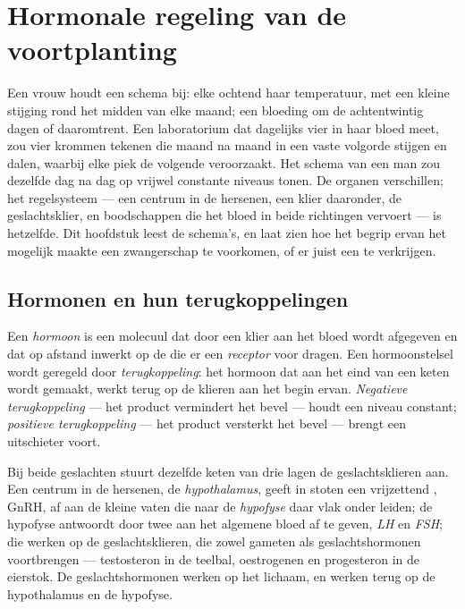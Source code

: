 \chapter{Hormonale regeling van de voortplanting}\label{ch:g11:hormones-and-reproduction}

Een vrouw houdt een schema bij: elke ochtend haar temperatuur, met een
kleine stijging rond het midden van elke maand; een bloeding om de
achtentwintig dagen of daaromtrent. Een laboratorium dat dagelijks vier
 in haar bloed meet, zou vier krommen tekenen die maand na maand
in een vaste volgorde stijgen en dalen, waarbij elke piek de volgende
veroorzaakt. Het schema van een man zou dezelfde  dag na dag op
vrijwel constante niveaus tonen. De organen verschillen; het regelsysteem
--- een centrum in de hersenen, een klier daaronder, de geslachtsklier, en
boodschappen die het bloed in beide richtingen vervoert --- is hetzelfde.
Dit hoofdstuk leest de schema's, en laat zien hoe het begrip ervan het
mogelijk maakte een zwangerschap te voorkomen, of er juist een te
verkrijgen.

\section{Hormonen en hun terugkoppelingen}

\begin{definition}\label{def:g11:hormones-and-reproduction:hormone}
Een \emph{hormoon} is een molecuul dat door een klier aan
het bloed wordt afgegeven en dat op afstand inwerkt op de  die er
een \emph{receptor} voor dragen. Een hormoonstelsel wordt geregeld door
\emph{terugkoppeling}: het hormoon dat aan het eind
van een keten wordt gemaakt, werkt terug op de klieren aan het begin
ervan. \emph{Negatieve terugkoppeling} --- het product vermindert het
bevel --- houdt een niveau constant; \emph{positieve terugkoppeling} ---
het product versterkt het bevel --- brengt een uitschieter voort.
\end{definition}

\begin{proposition}\label{prop:g11:hormones-and-reproduction:chain}
Bij beide geslachten stuurt dezelfde keten van drie lagen de
geslachtsklieren aan. Een centrum in de hersenen, de
\emph{hypothalamus}, geeft in stoten een vrijzettend , GnRH, af
aan de kleine vaten die naar de \emph{hypofyse} daar vlak onder leiden;
de hypofyse antwoordt door twee  aan het algemene bloed af te
geven, \emph{LH} en \emph{FSH}; die werken op de geslachtsklieren, die
zowel gameten als geslachtshormonen voortbrengen --- testosteron in de
teelbal, oestrogenen en progesteron in de eierstok. De
geslachtshormonen werken op het lichaam, en werken terug op de
hypothalamus en de hypofyse.
\end{proposition}
\admitted

